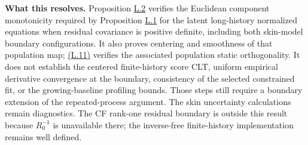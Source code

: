 \documentclass[11pt]{article}
\begin{document}
\textbf{What this resolves.} Proposition \hyperref[res:Proposition-L.2]{L.2} verifies the Euclidean component monotonicity required by Proposition \hyperref[res:Proposition-L.1]{L.1} for the latent long-history normalized equations when residual covariance is positive definite, including both skin-model boundary configurations. It also proves centering and smoothness of that population map; \hyperref[eq:L.11]{(L.11)} verifies the associated population static orthogonality. It does not establish the centered finite-history score CLT, uniform empirical derivative convergence at the boundary, consistency of the selected constrained fit, or the growing-baseline profiling bounds. Those steps still require a boundary extension of the repeated-process argument. The skin uncertainty calculations remain diagnostics. The CF rank-one residual boundary is outside this result because \(R_0^{-1}\) is unavailable there; the inverse-free finite-history implementation remains well defined.
\end{document}
